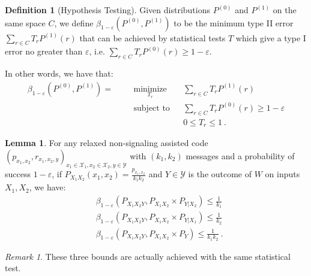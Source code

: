 \documentclass[11pt]{article}
\theoremstyle{definition}
\newtheorem{lem}[theo]{Lemma}
\newtheorem{defi}[theo]{Definition}
\theoremstyle{remark}
\newtheorem*{rk}{Remark}
\DeclareMathOperator{\mini}{\text{minimize}}
\DeclareMathOperator{\st}{\text{subject to}}
\begin{document}
\begin{defi}[Hypothesis Testing]
  \label{defi:beta}
  Given distributions $P^{(0)}$ and  $P^{(1)}$ on the same space $C$, we define $\beta_{1-\varepsilon}(P^{(0)},P^{(1)})$ to be the minimum type II error $\sum_{r \in C} T_rP^{(1)}(r)$ that can be achieved by statistical tests $T$ which give a type I error no greater than $\varepsilon$, i.e. $\sum_{r \in C} T_rP^{(0)}(r) \geq 1-\varepsilon$.

  In other words, we have that:
  \begin{equation}
    \begin{aligned}
      \beta_{1-\varepsilon}(P^{(0)},P^{(1)}) = &&&\underset{T_r}{\mini} &&\sum_{r \in C} T_rP^{(1)}(r)\\
      &&&\st &&\sum_{r \in C} T_rP^{(0)}(r) \geq 1-\varepsilon\\
      &&&&& 0 \leq T_r \leq 1 \ .
    \end{aligned}
  \end{equation}
\end{defi}

\begin{lem}
  \label{lem:beta}
    For any relaxed non-signaling assisted code $(p_{x_1,x_2}, r_{x_1,x_2,y})_{x_1 \in \mathcal{X}_1,x_2 \in \mathcal{X}_2,y \in \mathcal{Y}}$ with $(k_1,k_2)$ messages and a probability of success $1-\varepsilon$, if $P_{X_1X_2}(x_1,x_2)=\frac{p_{x_1,x_2}}{k_1k_2}$ and $Y \in \mathcal{Y}$ is the outcome of $W$ on inputs $X_1,X_2$, we have:
    \begin{equation}
      \begin{aligned}
        &\beta_{1-\varepsilon}\left(P_{X_1X_2Y},P_{X_1X_2} \times P_{Y|X_2}\right) \leq \frac{1}{k_1}\\
        &\beta_{1-\varepsilon}\left(P_{X_1X_2Y},P_{X_1X_2} \times P_{Y|X_1}\right) \leq \frac{1}{k_2}\\
        &\beta_{1-\varepsilon}\left(P_{X_1X_2Y},P_{X_1X_2} \times P_{Y}\right) \leq \frac{1}{k_1k_2}       \ .
      \end{aligned}
    \end{equation}
  \end{lem}

\begin{rk}
  These three bounds are actually achieved with the same statistical test.
\end{rk}
\end{document}
